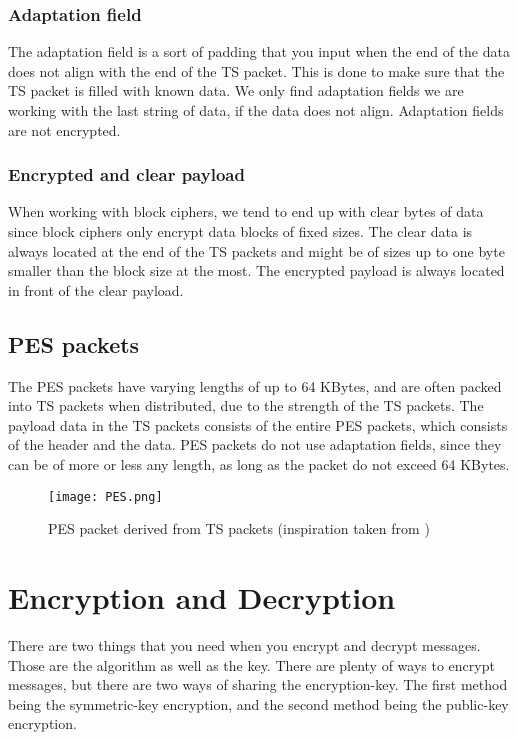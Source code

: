\subsubsection{Adaptation field}
The adaptation field is a sort of padding that you input when the end of the 
data does not align with the end of the TS packet. This is done to make sure 
that the TS packet is filled with known data. We only find adaptation fields we 
are working with the last string of data, if the data does not align. Adaptation 
fields are not encrypted. \cite[pp. 10--11]{DVB:2013}

\subsubsection{Encrypted and clear payload}
When working with block ciphers, we tend to end up with clear bytes of data 
since block ciphers only encrypt data blocks of fixed sizes. The clear data 
is always located at the end of the TS packets and might be of sizes up to one 
byte smaller than the block size at the most. The encrypted payload is always 
located in front of the clear payload. \cite[pp. 10--11]{DVB:2013}

\subsection{PES packets}
The PES packets have varying lengths of up to 64 KBytes, and are often packed 
into TS packets when distributed, due to the strength of the TS packets. The 
payload data in the TS packets consists of the entire PES packets, which 
consists of the header and the data. PES packets do not use adaptation fields, 
since they can be of more or less any length, as long as the packet do not 
exceed 64 KBytes.

\begin{figure}
  \texttt{[image: PES.png]}
  \label{img:PES}
  \caption{PES packet derived from TS packets (inspiration taken from 
    \citep[p. 9]{ETR:289} ) }
\end{figure}

\section{Encryption and Decryption}
There are two things that you need when you encrypt and decrypt messages. Those 
are the algorithm as well as the key. There are plenty of ways to encrypt 
messages, but there are two ways of sharing the encryption-key. The first method 
being the symmetric-key encryption, and the second method being the public-key 
encryption.

